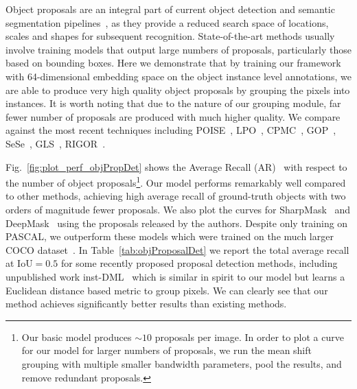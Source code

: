 Object proposals are an integral part of current object detection and semantic
segmentation pipelines~\cite{ren2015faster, he2017mask}, as they provide a
reduced search space of locations, scales and shapes for subsequent
recognition.  State-of-the-art methods usually involve training models that
output large numbers of proposals, particularly those based on bounding boxes.
Here we demonstrate that by training our framework with 64-dimensional
embedding space on the object instance level annotations, we are able to
produce very high quality object proposals by grouping the pixels into
instances.  It is worth noting that due to the nature of our grouping module,
far fewer number of proposals are produced with much higher quality.  We
compare against the most recent techniques including
POISE~\cite{humayun2015middle},
LPO~\cite{krahenbuhl2015learning},
CPMC~\cite{carreira2012cpmc},
GOP~\cite{krahenbuhl2014geodesic},
SeSe~\cite{uijlings2013selective},
GLS~\cite{rantalankila2014generating},
RIGOR~\cite{humayun2014rigor}.


Fig.~\ref{fig:plot_perf_objPropDet} shows the Average Recall
(AR)~\cite{hosang2016makes} with respect to the number of object
proposals\footnote{Our basic model produces $\sim10$ proposals per image.  In order
to plot a curve for our model for larger numbers of proposals, we run the mean
shift grouping with multiple smaller bandwidth parameters, pool the results,
and remove redundant proposals.}. Our model performs remarkably well compared
to other methods, achieving high average recall of ground-truth objects with two
orders of magnitude fewer proposals.  We also plot the curves for
SharpMask~\cite{pinheiro2015learning} and DeepMask~\cite{pinheiro2016learning}
using the proposals released by the authors. Despite only training on PASCAL,
we outperform these models which were trained on the much larger COCO dataset~\cite{lin2014microsoft}.
In Table~\ref{tab:objProposalDet} we report the total average recall at
IoU$=0.5$ for some recently proposed proposal detection methods, including
unpublished work inst-DML~\cite{fathi2017semantic} which is similar in spirit
to our model but learns a Euclidean distance based metric to group pixels.
We can clearly see that our method achieves significantly better results than
existing methods.

